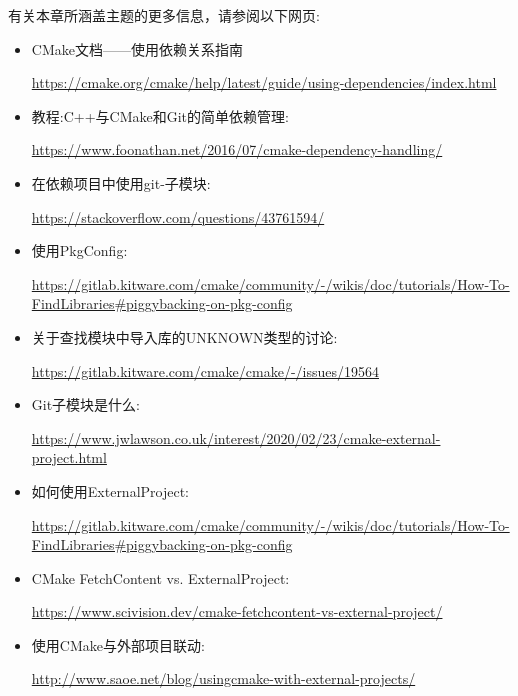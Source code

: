 有关本章所涵盖主题的更多信息，请参阅以下网页:

\begin{itemize}
\item 
CMake文档——使用依赖关系指南

\url{https://cmake.org/cmake/help/latest/guide/using-dependencies/index.html}

\item 
教程:C++与CMake和Git的简单依赖管理:

\url{https://www.foonathan.net/2016/07/cmake-dependency-handling/}

\item 
在依赖项目中使用git-子模块:

\url{ https://stackoverflow.com/questions/43761594/}


\item 
使用PkgConfig:

\url{https://gitlab.kitware.com/cmake/community/-/wikis/doc/tutorials/How-To-FindLibraries\#piggybacking-on-pkg-config}

\item 
关于查找模块中导入库的UNKNOWN类型的讨论:

\url{https://gitlab.kitware.com/cmake/cmake/-/issues/19564}

\item 
Git子模块是什么:

\url{https://www.jwlawson.co.uk/interest/2020/02/23/cmake-external-project.html}

\item 
如何使用ExternalProject:

\url{https://gitlab.kitware.com/cmake/community/-/wikis/doc/tutorials/How-To-FindLibraries\#piggybacking-on-pkg-config}


\item 
CMake FetchContent vs. ExternalProject: 

\url{ https://www.scivision.dev/cmake-fetchcontent-vs-external-project/}

\item 
使用CMake与外部项目联动:

\url{http://www.saoe.net/blog/usingcmake-with-external-projects/}
\end{itemize}